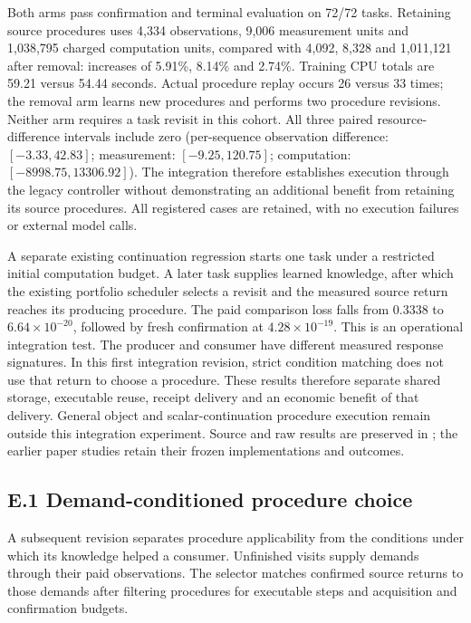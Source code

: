 \documentclass[twoside,11pt]{article}
\begin{document}
Both arms pass confirmation and terminal evaluation on 72/72 tasks. Retaining
source procedures uses 4,334 observations, 9,006 measurement units and 1,038,795
charged computation units, compared with 4,092, 8,328 and 1,011,121 after removal:
increases of 5.91\%, 8.14\% and 2.74\%. Training CPU totals are 59.21 versus 54.44
seconds. Actual procedure replay occurs 26 versus 33 times; the removal arm
learns new procedures and performs two procedure revisions. Neither arm requires
a task revisit in this cohort. All three paired resource-difference intervals
include zero (per-sequence observation difference: \([-3.33,42.83]\); measurement:
\([-9.25,120.75]\); computation: \([-8998.75,13306.92]\)). The integration therefore
establishes execution through the legacy controller without demonstrating an
additional benefit from retaining its source procedures. All registered cases
are retained, with no execution failures or external model calls.


A separate existing continuation regression starts one task under a restricted
initial computation budget. A later task supplies learned knowledge, after which
the existing portfolio scheduler selects a revisit and the measured source return
reaches its producing procedure. The paid comparison loss falls from 0.3338 to
\(6.64\times10^{-20}\), followed by fresh confirmation at
\(4.28\times10^{-19}\). This is an operational integration test. The
producer and consumer have different measured response signatures. In this first
integration revision, strict condition matching does not use that return to choose
a procedure. These
results therefore separate shared storage, executable reuse, receipt delivery and
an economic benefit of that delivery. General object and scalar-continuation
procedure execution remain outside this integration experiment. Source and raw
results are preserved in ; the earlier
paper studies retain their frozen implementations and outcomes.


\subsection*{E.1 Demand-conditioned procedure choice}

A subsequent revision separates procedure applicability from the conditions under
which its knowledge helped a consumer. Unfinished visits supply demands through
their paid observations. The selector matches confirmed source returns to those
demands after filtering procedures for executable steps and acquisition and
confirmation budgets.
\end{document}
